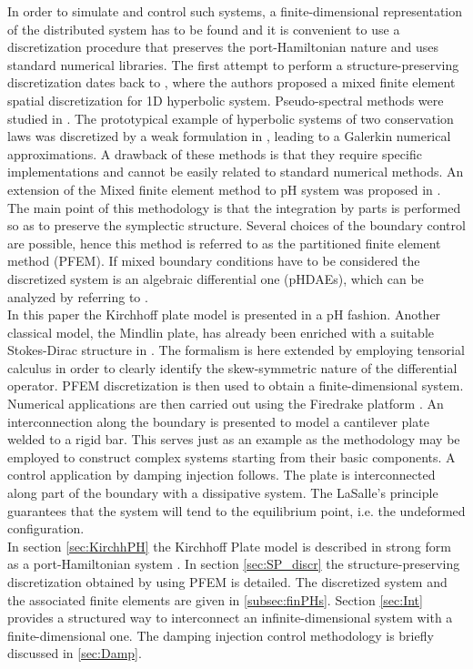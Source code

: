 \documentclass[letterpaper, 10 pt, conference]{ieeeconf}
\begin{document}
In order to simulate and control such systems, a finite-dimensional representation of the distributed system has to be found and it is convenient to use a discretization procedure that preserves the port-Hamiltonian nature and uses standard numerical libraries. The first attempt to perform a structure-preserving discretization dates back to \cite{Golo}, where the authors proposed a mixed finite element spatial discretization for 1D hyperbolic system. Pseudo-spectral methods were studied in \cite{moulla:hal-01625008}. The prototypical example of hyperbolic systems of two conservation laws was discretized by a weak formulation in \cite{WeakForm_Kot}, leading to a Galerkin numerical approximations. A drawback of these methods is that they require specific implementations and cannot be easily related to standard numerical methods. An extension of the Mixed finite element method to pH system was proposed in \cite{CardosoRibeiro2018}. The main point of this methodology is that the integration by parts is performed so as to preserve the symplectic structure. Several choices of the boundary control are possible, hence this method is referred to as the partitioned finite element method (PFEM). If mixed boundary conditions have to be considered the discretized system is an algebraic differential one (pHDAEs), which can be analyzed by referring to \cite{beattie2018linear,vanderSchaft2013}. \\

In this paper the Kirchhoff plate model is presented in a pH fashion. Another classical model, the Mindlin plate, has already been enriched with a suitable Stokes-Dirac structure in \cite{MacchelliMindlin}. The formalism is here extended by employing  tensorial calculus in order to clearly identify the skew-symmetric nature of the differential operator. PFEM discretization is then used to obtain a finite-dimensional system. Numerical applications are then carried out using the Firedrake platform \cite{firedrake}. An interconnection along the boundary is presented to model a cantilever plate welded to a rigid bar. This serves just as an example as the methodology may be employed to construct complex systems starting from their basic components. A control application by damping injection follows. The plate is interconnected along part of the boundary with a dissipative system. The LaSalle's principle guarantees that the system will tend to the equilibrium point, i.e. the undeformed configuration. \\

In section \ref{sec:KirchhPH} the Kirchhoff Plate model is described in strong form as a port-Hamiltonian system . In section \ref{sec:SP_discr} the structure-preserving discretization obtained by using PFEM  is detailed. The discretized system and the associated finite elements are given in \ref{subsec:finPHs}. Section \ref{sec:Int} provides a structured way to interconnect an infinite-dimensional system with a finite-dimensional one. The damping injection control methodology is briefly discussed in \ref{sec:Damp}. 
\end{document}
